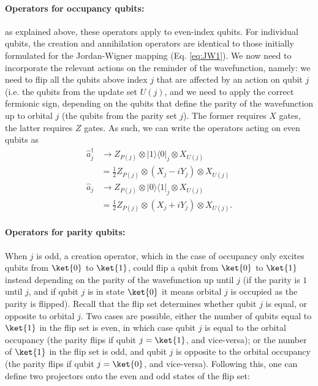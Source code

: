 \paragraph{Operators for occupancy qubits:} as explained above, these operators apply to even-index qubits. For individual qubits, the creation and annihilation operators are identical to those initially formulated for the Jordan-Wigner mapping (Eq. \ref{eq:JW1}). We now need to incorporate the relevant actions on the reminder of the wavefunction, namely: we need to flip all the qubits above index $j$ that are affected by an action on qubit $j$ (i.e. the qubits from the update set $U(j)$, and we need to apply the correct fermionic sign, depending on the qubits that define the parity of the wavefunction up to orbital $j$ (the qubits from the parity set $j$). The former requires $X$ gates, the latter requires $Z$ gates. As such, we can write the operators acting on even qubits as
\begin{equation}
\label{eq:BKladder1}
\begin{aligned}
\hat{a}_{j}^{\dagger} &\rightarrow Z_{P(j)} \otimes |1\rangle \langle 0|_j \otimes X_{U(j)} \\
&= \frac{1}{2}  Z_{P(j)} \otimes \left(  X_{j} - iY_{j} \right) \otimes X_{U(j)}  \\
\hat{a}_{j} &\rightarrow Z_{P(j)} \otimes |0\rangle \langle 1|_j \otimes X_{U(j)}\\
&= \frac{1}{2} Z_{P(j)} \otimes \left(X_{j} + i Y_{j}\right) \otimes X_{U(j)} .
\end{aligned}
\end{equation}

\paragraph{Operators for parity qubits:} When $j$ is odd, a creation operator, which in the case of occupancy only excites qubits from $\ket{0}$ to $\ket{1}$, could flip a qubit from $\ket{0}$ to $\ket{1}$ instead depending on the parity of the wavefunction up until $j$ (if the parity is $1$ until $j$, and if qubit $j$ is in state $\ket{0}$ it means orbital $j$ is occupied as the parity is flipped). Recall that the flip set determines whether qubit $j$ is equal, or opposite to orbital $j$. Two cases are possible, either the number of qubits equal to $\ket{1}$ in the flip set is even, in which case qubit $j$ is equal to the orbital occupancy (the parity flips if qubit $j = \ket{1}$, and vice-versa); or the number of $\ket{1}$ in the flip set is odd, and qubit $j$ is opposite to the orbital occupancy (the parity flips if qubit $j = \ket{0}$, and vice-versa). Following this, one can define two projectors onto the even and odd states of the flip set:

